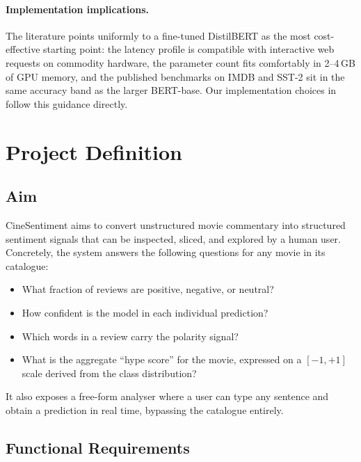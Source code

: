 \documentclass[11pt, a4paper]{article}
\begin{document}
\paragraph{Implementation implications.}
The literature points uniformly to a fine-tuned DistilBERT as the most cost-effective starting point: the latency profile is compatible with interactive web requests on commodity hardware, the parameter count fits comfortably in 2--4\,GB of GPU memory, and the published benchmarks on IMDB and SST-2 sit in the same accuracy band as the larger BERT-base. Our implementation choices in  follow this guidance directly.

\section{Project Definition}\label{sec:project}

\subsection{Aim}

CineSentiment aims to convert unstructured movie commentary into structured sentiment signals that can be inspected, sliced, and explored by a human user. Concretely, the system answers the following questions for any movie in its catalogue:

\begin{itemize}[leftmargin=1.4em, itemsep=2pt, topsep=4pt]
  \item What fraction of reviews are positive, negative, or neutral?
  \item How confident is the model in each individual prediction?
  \item Which words in a review carry the polarity signal?
  \item What is the aggregate ``hype score'' for the movie, expressed on a $[-1,+1]$ scale derived from the class distribution?
\end{itemize}

It also exposes a free-form analyser where a user can type any sentence and obtain a prediction in real time, bypassing the catalogue entirely.

\subsection{Functional Requirements}
\end{document}
